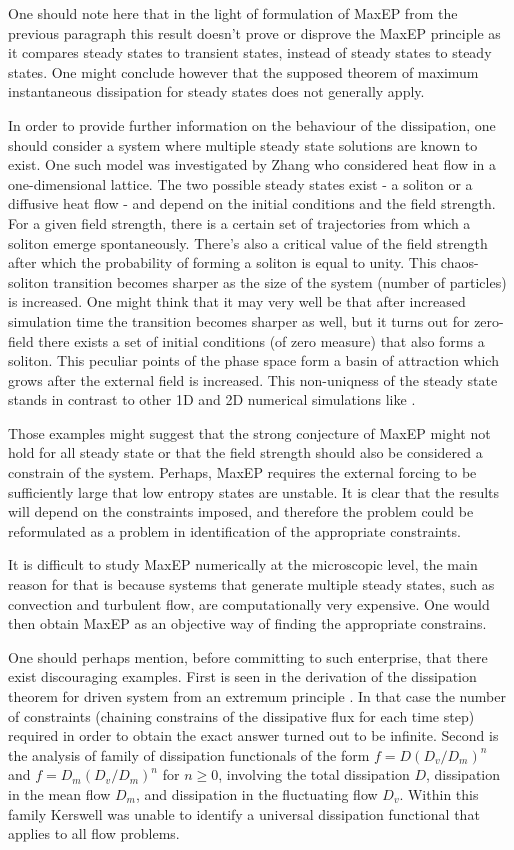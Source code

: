 \documentclass[a4paper,12pt]{article}
\begin{document}
One should note here that in the light of formulation of MaxEP from the previous paragraph this result doesn't prove or disprove the MaxEP principle as it compares steady states to transient states, instead of steady states to steady states. One might conclude however that the supposed theorem of maximum instantaneous dissipation for steady states does not generally apply.

In order to provide further information on the behaviour of the dissipation, one should consider a system where multiple steady state solutions are known to exist. One such model was investigated by Zhang\cite{Zhang:2001jc} who considered heat flow in a one-dimensional lattice. The two possible steady states exist - a soliton or a diffusive heat flow - and depend on the initial conditions and the field strength.
For a given field strength, there is a certain set of trajectories from which a soliton emerge spontaneously. There's also a critical value of the field strength after which the probability of forming a soliton is equal to unity. This chaos-soliton transition becomes sharper as the size of the system (number of particles) is increased. 
One might think that it may very well be that after increased simulation time the transition becomes sharper as well, but it turns out for zero-field there exists a set of initial conditions (of zero measure) that also forms a soliton. This peculiar points of the phase space form a basin of attraction which grows after the external field is increased. This non-uniqness of the steady state stands in contrast to other 1D and 2D  numerical simulations like \cite{Maeda:1995bj}.

Those examples might suggest that the strong conjecture of MaxEP might not hold for all steady state or that the field strength should also be considered a constrain of the system.
Perhaps, MaxEP requires the external forcing to be sufficiently large that low entropy states are unstable. It is clear that the results will depend on the constraints imposed, and therefore the problem could be reformulated as a problem in identification of the appropriate constraints.

It is difficult to study MaxEP numerically at the microscopic level, the main reason for that is because systems that generate multiple steady states, such as convection and turbulent flow, are computationally very expensive. One would then obtain MaxEP as an objective way of finding the appropriate constrains.

One should perhaps mention, before committing to such enterprise, that there exist discouraging examples. First is seen in the derivation of the dissipation theorem for driven system from an extremum principle \cite{Evans:1985br}. In that case the number of constraints (chaining constrains of the dissipative flux for each time step) required in order to obtain the exact answer turned out to be infinite. 
Second is the analysis of family of dissipation functionals of the form $f= D(D_v/D_m)^n$ and $f= D_m(D_v/D_m)^n$ for $n\geq 0$, involving the total dissipation $D$, dissipation in the mean flow $D_m$, and dissipation in the fluctuating flow $D_v$. Within this family Kerswell \cite{Kerswell:2002bw} was unable to identify a universal dissipation functional that applies to all flow problems.
\end{document}
